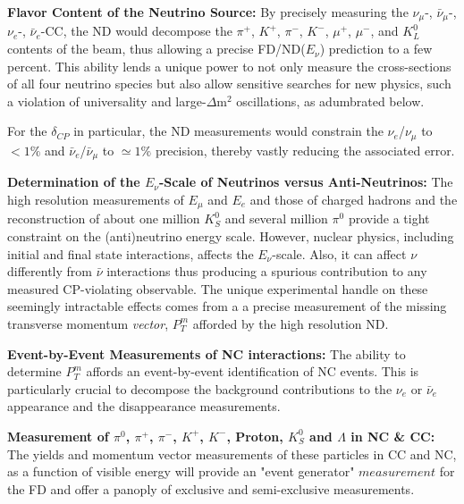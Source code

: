 \vspace{0.25cm} 
\noindent 
{\bf Flavor Content of the Neutrino Source:} By precisely measuring the $\nu_\mu$-, $\bar \nu_\mu$-, $\nu_e$-, $\bar \nu_e$-CC, 
the ND would decompose the $\pi^+$, $K^+$, $\pi^-$, $K^-$, $\mu^+$, $\mu^-$, and $K^0_L$ contents of the beam, thus 
allowing a precise FD/ND($E_\nu$) prediction to a few percent.  This ability lends a unique power to 
not only measure the cross-sections of all four neutrino species but also allow sensitive searches for new 
physics, such a violation of universality and large-$\Delta$m$^2$ oscillations,  as adumbrated below. 

For the $\delta_{CP}$ in particular, the ND measurements would constrain the $\nu_e$/$\nu_\mu$ to 
$<1\%$ and $\bar \nu_e$/$\bar \nu_\mu$ to $\simeq 1\%$ precision, thereby vastly reducing the associated error. 



\vspace{0.25cm} 
\noindent 
{\bf Determination of the $E_\nu$-Scale of Neutrinos versus Anti-Neutrinos:} The high resolution 
measurements of $E_\mu$ and $E_e$ and those of charged hadrons and the reconstruction of about one 
million $K^0_S$ and several million $\pi^0$ provide a tight constraint on the (anti)neutrino energy scale. 
However,  nuclear physics, including initial and final state interactions, 
 affects the $E_\nu$-scale. Also, it can affect $\nu$ differently from $\bar\nu$ interactions thus  
producing a spurious contribution to any measured CP-violating observable. 
The unique experimental handle on these seemingly intractable effects comes from a 
a precise measurement of the missing transverse momentum {\it vector},{ \bf{ $P^m_T$}} afforded by the 
high resolution ND. 


\vspace{0.25cm} 
\noindent 
{\bf Event-by-Event Measurements of NC interactions:} The ability to determine  { \bf{ $P^m_T$}} affords an event-by-event 
identification of NC events. This is particularly crucial to decompose the background contributions to 
the $\nu_e$ or $\bar \nu_e$ appearance and the disappearance measurements. 


\vspace{0.25cm} 
\noindent 
{\bf Measurement of $\pi^0$, $\pi^+$, $\pi^-$, $K^+$, $K^-$, Proton, $K^0_S$ and $\Lambda$ in NC \& CC:} 
The yields and momentum vector measurements of these particles in CC and NC, as a function of 
visible energy will provide an "event generator" $measurement$ for the FD and offer a panoply 
of exclusive and semi-exclusive measurements. 



